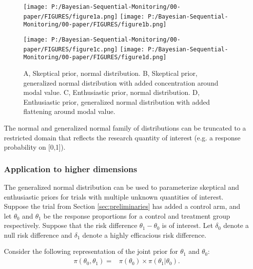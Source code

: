 \documentclass[12pt]{article}
\begin{document}
%

\begin{figure}\begin{center}
\texttt{[image: P:/Bayesian-Sequential-Monitoring/00-paper/FIGURES/figure1a.png]}
\texttt{[image: P:/Bayesian-Sequential-Monitoring/00-paper/FIGURES/figure1b.png]}

\texttt{[image: P:/Bayesian-Sequential-Monitoring/00-paper/FIGURES/figure1c.png]}
\texttt{[image: P:/Bayesian-Sequential-Monitoring/00-paper/FIGURES/figure1d.png]}

\caption{A, Skeptical prior, normal distribution. B, Skeptical prior, generalized normal distribution with added concentration around modal value. C, Enthusiastic prior, normal distribution. D, Enthusiastic prior, generalized normal distribution with added flattening around modal value.}
\label{fig:figure1}
\end{center}\end{figure}

The normal and generalized normal family of distributions can be truncated to a restricted domain that reflects the research quantity of interest (e.g. a response probability on [0,1]).
\subsubsection{Application to higher dimensions}
The generalized normal distribution can be used to parameterize skeptical and enthusiastic priors for trials with multiple unknown quantities of interest. Suppose the trial from Section \ref{sec:preliminaries} has added a control arm, and let $\theta_0$ and $\theta_1$ be the response proportions for a control and treatment group respectively. Suppose that the risk difference $\theta_1-\theta_0$ is of interest. Let $\delta_0$ denote a null risk difference and $\delta_1$ denote a highly efficacious risk difference.

Consider the following representation of the joint prior for $\theta_1$ and $\theta_0$:
\begin{align}
\pi(\theta_0,\theta_1)=&\pi(\theta_0)\times\pi(\theta_1|\theta_0). \label{eq:generalized_normal_joint}
\end{align}
\end{document}
